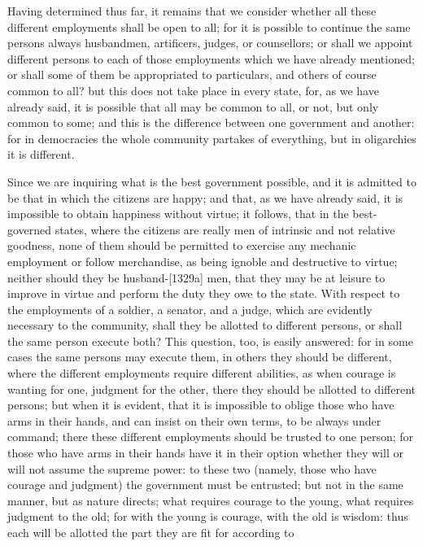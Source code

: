 
Having determined thus far, it remains that we consider whether all these
different employments shall be open to all; for it is possible to continue
the same persons always husbandmen, artificers, judges, or counsellors; or
shall we appoint different persons to each of those employments which we
have already mentioned; or shall some of them be appropriated to
particulars, and others of course common to all? but this does not take
place in every state, for, as we have already said, it is possible that
all may be common to all, or not, but only common to some; and this is the
difference between one government and another: for in democracies the
whole community partakes of everything, but in oligarchies it is
different.

Since we are inquiring what is the best government possible, and it is
admitted to be that in which the citizens are happy; and that, as we have
already said, it is impossible to obtain happiness without virtue; it
follows, that in the best-governed states, where the citizens are really
men of intrinsic and not relative goodness, none of them should be
permitted to exercise any mechanic employment or follow merchandise, as
being ignoble and destructive to virtue; neither should they be
husband-[1329a] men, that they may be at leisure to improve in virtue and
perform the duty they owe to the state. With respect to the employments of
a soldier, a senator, and a judge, which are evidently necessary to the
community, shall they be allotted to different persons, or shall the same
person execute both? This question, too, is easily answered: for in some
cases the same persons may execute them, in others they should be
different, where the different employments require different abilities, as
when courage is wanting for one, judgment for the other, there they should
be allotted to different persons; but when it is evident, that it is
impossible to oblige those who have arms in their hands, and can insist on
their own terms, to be always under command; there these different
employments should be trusted to one person; for those who have arms in
their hands have it in their option whether they will or will not assume
the supreme power: to these two (namely, those who have courage and
judgment) the government must be entrusted; but not in the same manner,
but as nature directs; what requires courage to the young, what requires
judgment to the old; for with the young is courage, with the old is
wisdom: thus each will be allotted the part they are fit for according to
